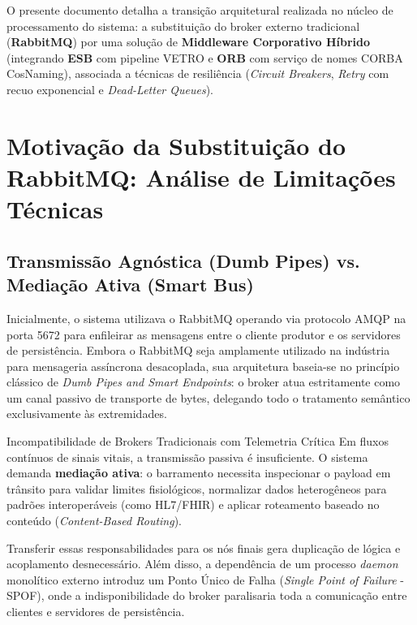 \documentclass[11pt,a4paper]{article}
\begin{document}
O presente documento detalha a transição arquitetural realizada no núcleo de processamento do sistema: a substituição do broker externo tradicional (\textbf{RabbitMQ}) por uma solução de \textbf{Middleware Corporativo Híbrido} (integrando \textbf{ESB} com pipeline VETRO e \textbf{ORB} com serviço de nomes CORBA CosNaming), associada a técnicas de resiliência (\textit{Circuit Breakers}, \textit{Retry} com recuo exponencial e \textit{Dead-Letter Queues}).

\section{Motivação da Substituição do RabbitMQ: Análise de Limitações Técnicas}

\subsection{Transmissão Agnóstica (Dumb Pipes) vs. Mediação Ativa (Smart Bus)}
Inicialmente, o sistema utilizava o RabbitMQ operando via protocolo AMQP na porta 5672 para enfileirar as mensagens entre o cliente produtor e os servidores de persistência. Embora o RabbitMQ seja amplamente utilizado na indústria para mensageria assíncrona desacoplada, sua arquitetura baseia-se no princípio clássico de \textit{Dumb Pipes and Smart Endpoints}: o broker atua estritamente como um canal passivo de transporte de bytes, delegando todo o tratamento semântico exclusivamente às extremidades.

\begin{fundamento}{Incompatibilidade de Brokers Tradicionais com Telemetria Crítica}
Em fluxos contínuos de sinais vitais, a transmissão passiva é insuficiente. O sistema demanda \textbf{mediação ativa}: o barramento necessita inspecionar o payload em trânsito para validar limites fisiológicos, normalizar dados heterogêneos para padrões interoperáveis (como HL7/FHIR) e aplicar roteamento baseado no conteúdo (\textit{Content-Based Routing}). 

Transferir essas responsabilidades para os nós finais gera duplicação de lógica e acoplamento desnecessário. Além disso, a dependência de um processo \textit{daemon} monolítico externo introduz um Ponto Único de Falha (\textit{Single Point of Failure} - SPOF), onde a indisponibilidade do broker paralisaria toda a comunicação entre clientes e servidores de persistência.
\end{fundamento}
\end{document}
